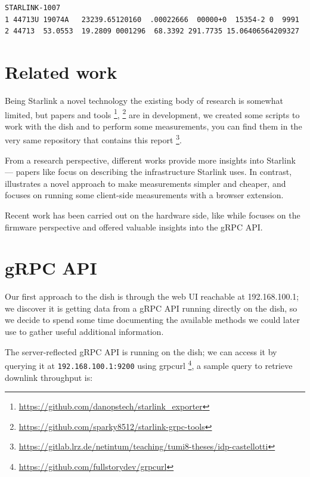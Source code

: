 \documentclass[IN,11pt,twoside,openright,idp,english]{tumthesis}
\begin{document}
\begin{lstlisting}[caption={TLE for satellite STARLINK-1007 },captionpos=b]
STARLINK-1007           
1 44713U 19074A   23239.65120160  .00022666  00000+0  15354-2 0  9991
2 44713  53.0553  19.2809 0001296  68.3392 291.7735 15.06406564209327
\end{lstlisting}
    
\section{Related work}
    
Being Starlink a novel technology the existing body of research is somewhat limited, but papers and tools \footnote{\url{https://github.com/danopstech/starlink\_exporter}}, \footnote{\url{https://github.com/sparky8512/starlink-grpc-tools}} are in development, we created some scripts to work with the dish and to perform some measurements, you can find them in the very same repository that contains this report \footnote{\url{https://gitlab.lrz.de/netintum/teaching/tumi8-theses/idp-castellotti}}.
    
From a research perspective, different works provide more insights into Starlink — papers like \cite{pan2023measuring} focus on describing the infrastructure Starlink uses. In contrast, \cite{izhikevich2023democratizing} illustrates a novel approach to make measurements simpler and cheaper, and \cite{browser-side} focuses on running some client-side measurements with a browser extension.
    
Recent work has been carried out on the hardware side, like \cite{glitching} while \cite{quarkslab} focuses on the firmware perspective and offered valuable insights into the gRPC API.
    
\section{gRPC API}
    
Our first approach to the dish is through the web UI reachable at 192.168.100.1; we discover it is getting data from a gRPC API running directly on the dish, so we decide to spend some time documenting the available methods we could later use to gather useful additional information.
    
The server-reflected gRPC API is running on the dish; we can access it by querying it at \texttt{192.168.100.1:9200} using grpcurl \footnote{\url{https://github.com/fullstorydev/grpcurl}}, a sample query to retrieve downlink throughput is:
    
\end{document}
